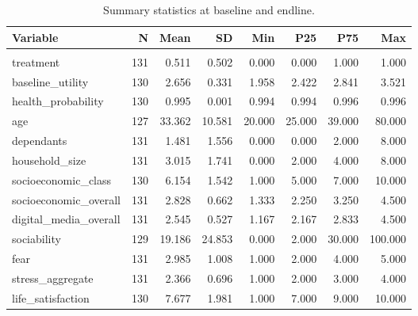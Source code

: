 \begin{table}

\caption{\label{tab:summarystatsbaseline}Summary statistics at baseline and endline.}
\centering
\begin{tabular}[t]{lrrrrrrr}
\toprule
Variable & N & Mean & SD & Min & P25 & P75 & Max\\
\midrule
\addlinespace[0.3em]
\multicolumn{8}{l}{\textbf{Baseline}}\\
\hspace{1em}treatment & 131 & 0.511 & 0.502 & 0.000 & 0.000 & 1.000 & 1.000\\
\hspace{1em}baseline\_utility & 130 & 2.656 & 0.331 & 1.958 & 2.422 & 2.841 & 3.521\\
\hspace{1em}health\_probability & 130 & 0.995 & 0.001 & 0.994 & 0.994 & 0.996 & 0.996\\
\hspace{1em}age & 127 & 33.362 & 10.581 & 20.000 & 25.000 & 39.000 & 80.000\\
\hspace{1em}dependants & 131 & 1.481 & 1.556 & 0.000 & 0.000 & 2.000 & 8.000\\
\hspace{1em}household\_size & 131 & 3.015 & 1.741 & 0.000 & 2.000 & 4.000 & 8.000\\
\hspace{1em}socioeconomic\_class & 130 & 6.154 & 1.542 & 1.000 & 5.000 & 7.000 & 10.000\\
\hspace{1em}socioeconomic\_overall & 131 & 2.828 & 0.662 & 1.333 & 2.250 & 3.250 & 4.500\\
\hspace{1em}digital\_media\_overall & 131 & 2.545 & 0.527 & 1.167 & 2.167 & 2.833 & 4.500\\
\hspace{1em}sociability & 129 & 19.186 & 24.853 & 0.000 & 2.000 & 30.000 & 100.000\\
\hspace{1em}fear & 131 & 2.985 & 1.008 & 1.000 & 2.000 & 4.000 & 5.000\\
\hspace{1em}stress\_aggregate & 131 & 2.366 & 0.696 & 1.000 & 2.000 & 3.000 & 4.000\\
\hspace{1em}life\_satisfaction & 130 & 7.677 & 1.981 & 1.000 & 7.000 & 9.000 & 10.000\\

\end{tabular}
\end{table}
